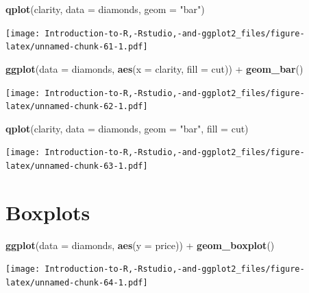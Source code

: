 \documentclass[]{book}
\newenvironment{Shaded}{\begin{snugshade}}{\end{snugshade}}
\newcommand{\KeywordTok}[1]{\textcolor[rgb]{0.13,0.29,0.53}{\textbf{{#1}}}}
\newcommand{\DataTypeTok}[1]{\textcolor[rgb]{0.13,0.29,0.53}{{#1}}}
\newcommand{\StringTok}[1]{\textcolor[rgb]{0.31,0.60,0.02}{{#1}}}
\newcommand{\NormalTok}[1]{{#1}}
\begin{document}
\begin{Shaded}
\begin{Highlighting}[]
\KeywordTok{qplot}\NormalTok{(clarity, }\DataTypeTok{data =} \NormalTok{diamonds, }\DataTypeTok{geom =} \StringTok{"bar"}\NormalTok{)}
\end{Highlighting}
\end{Shaded}

\texttt{[image: Introduction-to-R,-Rstudio,-and-ggplot2\_files/figure-latex/unnamed-chunk-61-1.pdf]}

\begin{Shaded}
\begin{Highlighting}[]
\KeywordTok{ggplot}\NormalTok{(}\DataTypeTok{data =} \NormalTok{diamonds, }\KeywordTok{aes}\NormalTok{(}\DataTypeTok{x =} \NormalTok{clarity, }\DataTypeTok{fill =} \NormalTok{cut)) +}\StringTok{ }\KeywordTok{geom_bar}\NormalTok{() }
\end{Highlighting}
\end{Shaded}

\texttt{[image: Introduction-to-R,-Rstudio,-and-ggplot2\_files/figure-latex/unnamed-chunk-62-1.pdf]}

\begin{Shaded}
\begin{Highlighting}[]
\KeywordTok{qplot}\NormalTok{(clarity, }\DataTypeTok{data =} \NormalTok{diamonds, }\DataTypeTok{geom =} \StringTok{"bar"}\NormalTok{, }\DataTypeTok{fill =} \NormalTok{cut)}
\end{Highlighting}
\end{Shaded}

\texttt{[image: Introduction-to-R,-Rstudio,-and-ggplot2\_files/figure-latex/unnamed-chunk-63-1.pdf]}

\section{Boxplots}\label{boxplots}

\begin{Shaded}
\begin{Highlighting}[]
\KeywordTok{ggplot}\NormalTok{(}\DataTypeTok{data =} \NormalTok{diamonds, }\KeywordTok{aes}\NormalTok{(}\DataTypeTok{y =} \NormalTok{price)) +}\StringTok{ }\KeywordTok{geom_boxplot}\NormalTok{() }
\end{Highlighting}
\end{Shaded}

\texttt{[image: Introduction-to-R,-Rstudio,-and-ggplot2\_files/figure-latex/unnamed-chunk-64-1.pdf]}
\end{document}

